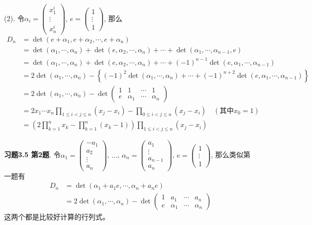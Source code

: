 (2). 令$\alpha_i = \begin{pmatrix} x_1^i \\ \vdots \\ x_n^i \end{pmatrix}$, $e = \begin{pmatrix} 1 \\ \vdots \\ 1 \end{pmatrix}$, 那么
\begin{align*}
D_n & = \det (e+\alpha_1, e+\alpha_2, \cdots, e+\alpha_n) \\
& = \det(\alpha_1, \cdots, \alpha_n) + \det(e, \alpha_2, \cdots, \alpha_n) + \cdots + \det(\alpha_1, \cdots, \alpha_{n-1}, e) \\
& = \det(\alpha_1, \cdots, \alpha_n) + \det(e, \alpha_2, \cdots, \alpha_n) + \cdots + (-1)^{n-1}\det(e, \alpha_1, \cdots, \alpha_{n-1}) \\
& = 2\det(\alpha_1, \cdots, \alpha_n) - \left\{(-1)^2\det(\alpha_1, \cdots, \alpha_n) + \cdots + (-1)^{n+2} \det(e, \alpha_1, \cdots, \alpha_{n-1})\right\} \\
& = 2\det(\alpha_1, \cdots, \alpha_n) - \det\begin{pmatrix} 1 & 1 & \cdots & 1 \\ e & \alpha_1 & \cdots & \alpha_n \end{pmatrix} \\
& = 2x_1\cdots x_n \prod_{1\leqslant i<j \leqslant n} (x_j-x_i) - \prod_{0\leqslant i<j \leqslant n} (x_j-x_i) \quad (\text{其中$x_0=1$}) \\
& = \left( 2\prod_{k=1}^n x_k - \prod_{k=1}^n(x_k-1) \right) \prod_{1\leqslant i<j \leqslant n} (x_j-x_i)
\end{align*}

\newpageorvspace

{\bf 习题3.5 第2题}. 令$\alpha_1 = \begin{pmatrix} -a_1 \\ a_2 \\ \vdots \\ a_n \end{pmatrix}$, $\ldots$, $\alpha_n = \begin{pmatrix} a_1 \\ \vdots \\ a_{n-1} \\ a_n \end{pmatrix}$, $e = \begin{pmatrix} 1 \\ \vdots \\ 1 \end{pmatrix}$, 那么类似第一题有
\begin{align*}
D_n & = \det(\alpha_1 + a_1e, \cdots, \alpha_n + a_ne) \\
& = 2\det(\alpha_1, \cdots, \alpha_n) - \det\begin{pmatrix} 1 & a_1 & \cdots & a_n \\ e & \alpha_1 & \cdots & \alpha_n \end{pmatrix}
\end{align*}
这两个都是比较好计算的行列式。


